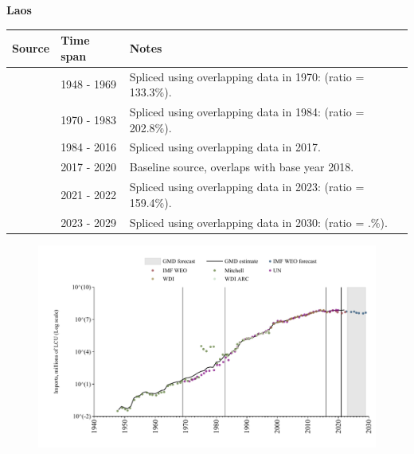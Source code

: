 \documentclass[12pt,a4paper,landscape]{article}
\begin{document}
\begin{adjustbox}{max totalsize={\paperwidth}{\paperheight},center}
\begin{minipage}[t][\textheight][t]{\textwidth}
\vspace*{0.5cm}
{}
\begin{center}
{\Large\bfseries Laos}
\end{center}
\vspace{0.5cm}
\begin{table}[H]
\centering
\small
\begin{tabular}{|l|l|l|}
\hline
\textbf{Source} & \textbf{Time span} & \textbf{Notes} \\
\hline
\rowcolor{white}\cite{Mitchell}& 1948 - 1969 &Spliced using overlapping data in 1970: (ratio = 133.3\%).\\
\rowcolor{lightgray}\cite{UN}& 1970 - 1983 &Spliced using overlapping data in 1984: (ratio = 202.8\%).\\
\rowcolor{white}\cite{WDI}& 1984 - 2016 &Spliced using overlapping data in 2017.\\
\rowcolor{lightgray}\cite{UN}& 2017 - 2020 &Baseline source, overlaps with base year 2018.\\
\rowcolor{white}\cite{IMF_WEO}& 2021 - 2022 &Spliced using overlapping data in 2023: (ratio = 159.4\%).\\
\rowcolor{lightgray}\cite{IMF_WEO_forecast}& 2023 - 2029 &Spliced using overlapping data in 2030: (ratio = .\%).\\
\hline
\end{tabular}
\end{table}
\begin{figure}[H]
\centering
\includegraphics[width=\textwidth,height=0.6\textheight,keepaspectratio]{graphs/LAO_imports.pdf}
\end{figure}
\end{minipage}
\end{adjustbox}
\end{document}
